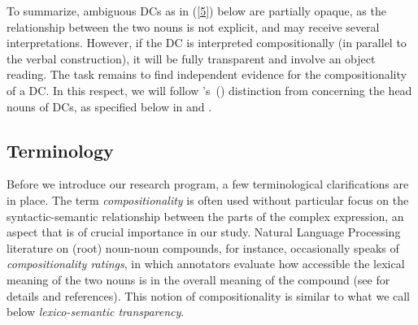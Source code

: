 \documentclass[output=paper]{langsci/langscibook}
\begin{document}
\begin{exe}
\end{exe}


To summarize, ambiguous DCs as in (\ref{5}) below are partially opaque, as the relationship between the two nouns is not explicit, and may receive several interpretations.
However, if the DC is interpreted compositionally (in parallel to the verbal construction), it will be fully transparent and involve an object reading. The task remains to find independent evidence for the compositionality of a DC. In this respect, we will follow \citeauthor{grimshaw:90}'s~(\citeyear{grimshaw:90}) distinction from  concerning the head nouns of DCs, as specified below in  and .

\begin{exe}
\end{exe}



\subsection{Terminology}
 Before we introduce our research program, a few terminological clarifications are in place. The term \textit{compositionality} is often used without particular focus on the syntactic-semantic relationship between the parts of the complex expression, an aspect that is of crucial importance in our study. Natural Language Processing literature on (root) noun-noun compounds, for instance, occasionally speaks of \textit{compositionality ratings}, in which annotators evaluate how accessible the lexical meaning of the two nouns is in the overall meaning of the compound (see  for details and references). This notion of compositionality is similar to what we call below \textit{lexico-semantic transparency}.
\end{document}
